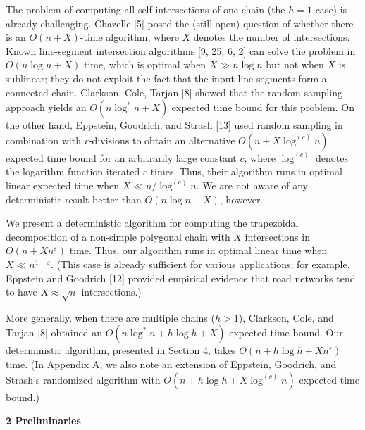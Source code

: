 \par
\par
The problem of computing all self-intersections of one chain (the $h=1$ case) is already challenging. Chazelle [5] posed the (still open) question of whether there is an $O(n+X)$-time algorithm, where $X$ denotes the number of intersections. Known line-segment intersection algorithms [9, 25, 6, 2] can solve the problem in $O(n\log n+X)$ time, which is optimal when $X\gg n\log n$ but not when $X$ is sublinear; they do not exploit the fact that the input line segments form a connected chain. Clarkson, Cole, Tarjan [8] showed that the random sampling approach yields an $O(n\log^{*}n+X)$ expected time bound for this problem. On the other hand, Eppstein, Goodrich, and Strash [13] used random sampling in combination with $r$-divisions to obtain an alternative $O(n+X\log^{(c)}n)$ expected time bound for an arbitrarily large constant $c$, where $\log^{(c)}$ denotes the logarithm function iterated $c$ times. Thus, their algorithm runs in optimal linear expected time when $X\ll n/\log^{(c)}n$. We are not aware of any deterministic result better than $O(n\log n+X)$, however.
\par
\par
We present a deterministic algorithm for computing the trapezoidal decomposition of a non-simple polygonal chain with $X$ intersections in $O(n+Xn^{\varepsilon})$ time. Thus, our algorithm runs in optimal linear time when $X\ll n^{1-\varepsilon}$. (This case is already sufficient for various applications; for example, Eppstein and Goodrich [12] provided empirical evidence that road networks tend to have $X\approx\sqrt{n}$ intersections.)
\par
\par
More generally, when there are multiple chains ($h>1$), Clarkson, Cole, and Tarjan [8] obtained an $O(n\log^{*}n+h\log h+X)$ expected time bound. Our deterministic algorithm, presented in Section 4, takes $O(n+h\log h+Xn^{\varepsilon})$ time. (In Appendix A, we also note an extension of Eppstein, Goodrich, and Strash’s randomized algorithm with $O(n+h\log h+X\log^{(c)}n)$ expected time bound.)
\par
\par
\par\medskip\noindent\textbf{2 Preliminaries}\par
